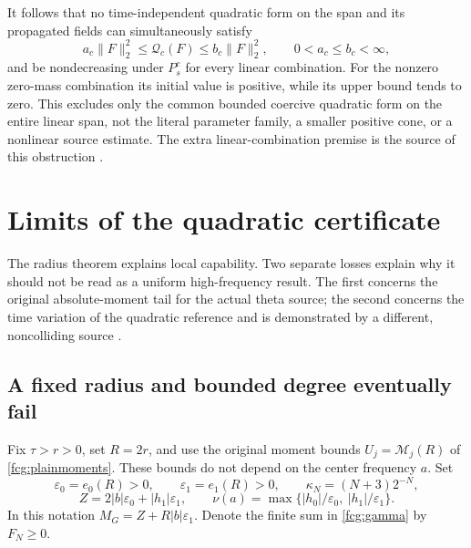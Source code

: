\documentclass[11pt]{article}
\numberwithin{equation}{section}
\begin{document}
It follows that no time-independent quadratic form on the span and
its propagated fields can simultaneously satisfy
\[
 a_c\|F\|_2^2\le\mathscr Q_c(F)\le b_c\|F\|_2^2,\qquad
 0<a_c\le b_c<\infty,
\]
and be nondecreasing under $P_s^c$ for every linear combination.
For the nonzero zero-mass combination its initial value is positive,
while its upper bound tends to zero. This excludes only the common
bounded coercive quadratic form on the entire linear span, not the
literal parameter family, a smaller positive cone, or a nonlinear
source estimate. The extra linear-combination premise is the source
of this obstruction \cite{FCGMoment}.

\section{Limits of the quadratic certificate}
\label{fcg:limits}

The radius theorem explains local capability. Two separate losses
explain why it should not be read as a uniform high-frequency result.
The first concerns the original absolute-moment tail for the actual
theta source; the second concerns the time variation of the quadratic
reference and is demonstrated by a different, noncolliding source
\cite{FCGLimits}.

\subsection{A fixed radius and bounded degree eventually fail}

Fix $\tau>r>0$, set $R=2r$, and use the original moment bounds
$U_j=\mathcal M_j(R)$ of \eqref{fcg:plainmoments}. These bounds do not
depend on the center frequency $a$. Set
\[
 \varepsilon_0=e_0(R)>0,\qquad \varepsilon_1=e_1(R)>0,\qquad
 \kappa_N=(N+3)2^{-N},
\]
\[
 Z=2|b|\varepsilon_0+|h_1|\varepsilon_1,\qquad
 \nu(a)=\max\{|h_0|/\varepsilon_0,\ |h_1|/\varepsilon_1\}.
\]
In this notation $M_G=Z+R|b|\varepsilon_1$. Denote the finite sum
in \eqref{fcg:gamma} by $F_N\ge0$.
\end{document}
